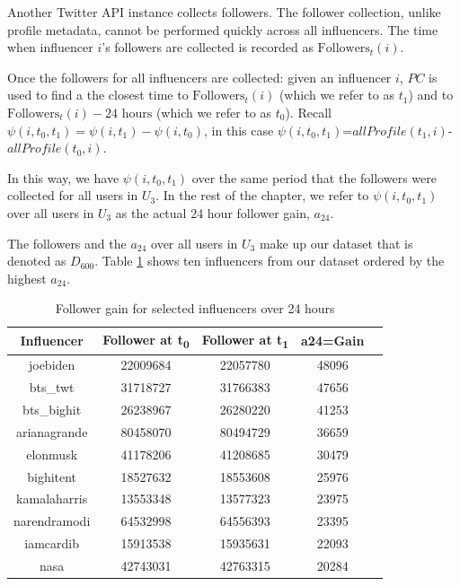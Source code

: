 Another Twitter API instance collects followers. The follower collection, unlike profile metadata, cannot be performed quickly across all influencers. The time when influencer $i$'s followers are collected is recorded as $\mbox{Followers}_t(i)$.

Once the followers for all influencers are collected: given an influencer $i$, $PC$ is used to find a the closest time to $\mbox{Followers}_t(i)$ (which we refer to as $t_1$) and to $\mbox{Followers}_t(i) - \mbox{24 hours}$ (which we refer to as $t_0$). Recall $\psi(i, t_0, t_1)=\psi(i, t_1)-\psi(i, t_0)$, in this case  $\psi(i, t_0, t_1)$=$allProfile(t_1, i)$-$allProfile(t_0, i)$. 

In this way, we have $\psi(i, t_0, t_1)$ over the same period that the followers were collected for all users in $U_3$. In the rest of the chapter, we refer to $\psi(i, t_0, t_1)$ over all users in $U_3$ as the actual 24 hour follower gain, $a_{24}$. 

The followers and the $a_{24}$ over all users in $U_3$ make up our dataset that is denoted as $D_{600}$. Table \ref{table_3N} shows ten influencers from our dataset ordered by the highest $a_{24}$.

\begin{table}[htbp]
\small
\caption{Follower gain for selected influencers over 24 hours}
\label{table_3N}
\centering
\begin{tabular}{|c|c|c|c|c|}
\hline
\bfseries Influencer & \bfseries Follower at t\textsubscript{0} & \bfseries Follower at t\textsubscript{1} & \bfseries a24=Gain\\
\hline
joebiden & 22009684 & 22057780 & 48096\\
\hline
bts\_twt & 31718727 & 31766383 & 47656\\
\hline
bts\_bighit & 26238967 & 26280220 & 41253\\
\hline
arianagrande & 80458070 & 80494729 & 36659\\
\hline
elonmusk & 41178206 & 41208685 & 30479\\
\hline
bighitent & 18527632 & 18553608 & 25976\\
\hline
kamalaharris & 13553348 & 13577323 & 23975\\
\hline
narendramodi & 64532998 & 64556393 & 23395\\
\hline
iamcardib & 15913538 & 15935631 & 22093\\
\hline
nasa & 42743031 & 42763315 & 20284\\
\hline
\end{tabular}
\end{table}

